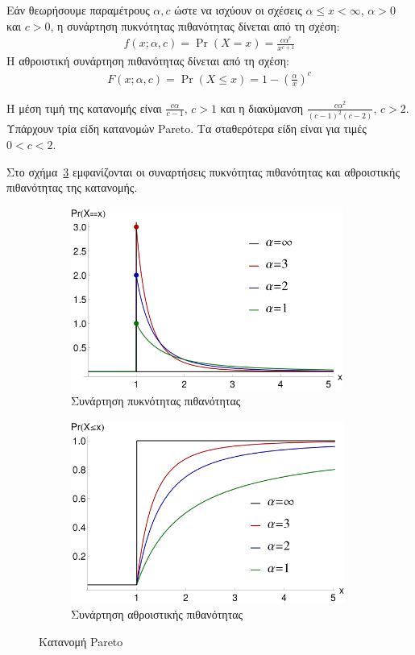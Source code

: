\documentclass[12pt]{report}
\begin{document}
Εάν θεωρήσουμε παραμέτρους \(\alpha, c\) ώστε να ισχύουν οι σχέσεις \(\alpha \leq x < \infty\), \(\alpha > 0\) και \(c > 0\), η συνάρτηση πυκνότητας πιθανότητας δίνεται από τη σχέση:
\begin{align*}
f(x;\alpha,c)=\Pr(X=x)=\frac{c \alpha ^{c}}{x^{c+1}}
\end{align*}
Η αθροιστική συνάρτηση πιθανότητας δίνεται από τη σχέση:
\begin{align*}
F(x;\alpha,c)=\Pr(X \leq x)=1-\left(\frac{\alpha}{x}\right)^{c}
\end{align*}

Η μέση τιμή της κατανομής είναι \(\frac{c \alpha}{c-1}\), \(c>1\) και η διακύμανση \(\frac{c \alpha ^2}{(c-1)^2(c-2)}\), \(c>2\). Υπάρχουν τρία είδη κατανομών \textlatin{Pareto}. Τα σταθερότερα είδη είναι για τιμές \(0<c<2\).

Στο σχήμα~\ref{fig:Pareto_Dist} εμφανίζονται οι συναρτήσεις πυκνότητας πιθανότητας και αθροιστικής πιθανότητας της κατανομής.
\begin{figure}[h]
\begin{subfigure}{0.5\textwidth}
\includegraphics[width=1.0\linewidth, height=6cm]{par_dist_pmf} 
\caption{Συνάρτηση πυκνότητας πιθανότητας}
\label{fig:Pareto_Dist_PMF}
\end{subfigure}
\begin{subfigure}{0.5\textwidth}
\includegraphics[width=1.0\linewidth, height=6cm]{par_dist_cdf}
\caption{Συνάρτηση αθροιστικής πιθανότητας}
\label{fig:Pareto_Dist_CDF}
\end{subfigure}
 
\caption{Κατανομή \textlatin{Pareto}}
\label{fig:Pareto_Dist}
\end{figure}
\end{document}

